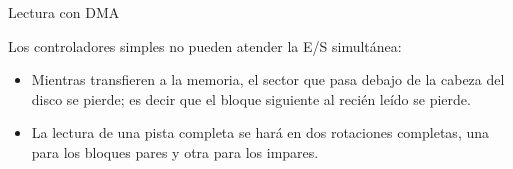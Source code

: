 \documentclass{beamer}
\begin{document}
\begin{frame}{Lectura con DMA}
    
        \begin{block}{
            Los controladores simples no pueden atender la E/S simultánea:
            \pause
        }
        \begin{itemize}
            \item {
                Mientras transfieren a la memoria, el sector que pasa debajo de la cabeza del disco se pierde; es decir que el bloque siguiente al recién leído se pierde.
                \pause
            }
            
            \item {
                 La lectura de una pista completa se hará en dos rotaciones completas, una para los bloques pares y otra para los impares.
                
            }

            
        \end{itemize}
        \end{block}
        
\end{frame}
\end{document}
